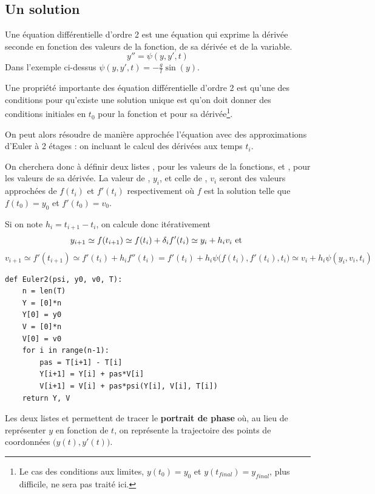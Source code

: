\subsection{Un solution} \label{sec:sol}
Une équation différentielle d'ordre 2 est une équation qui exprime la dérivée seconde en fonction des valeurs de la fonction, de sa dérivée et de la variable.
\[y'' = \psi(y, y', t)\]
Dans l'exemple ci-dessus $\psi(y, y', t) = -\frac g l \sin(y)$.

\medskip

Une propriété importante des équation différentielle d'ordre 2 est qu'une des conditions pour qu'existe une solution unique est qu'on doit donner des conditions initiales en $t_0$ pour la fonction et pour sa dérivée\footnote{Le cas des conditions aux limites, $y(t_0) = y_0$ et $y(t_{final}) = y_{final}$, plus difficile, ne sera pas traité ici.}.

On peut alors résoudre de manière approchée l'équation avec des approximations d'Euler à 2 étages : on incluant le calcul des dérivées aux temps $t_i$. 

On cherchera donc à définir deux listes , pour les valeurs de la fonctions, et , pour les valeurs de sa dérivée. La valeur de , $y_i$, et celle de , $v_i$ seront des valeurs approchées de $f(t_i)$ et $f'(t_i)$ respectivement où $f$ est la solution telle que $f(t_0) = y_0$ et $f'(t_0)= v_0$.

Si on note $h_i = t_{i+1} - t_i$, on calcule donc itérativement 
\[y_{i+1}\simeq f(t_{i+1}) \simeq f(t_i) + \delta_i f'(t_i)  \simeq y_i + h_i v_i\hbox{ et }\]
\[v_{i+1}\simeq f'(t_{i+1}) \simeq f'(t_i) + h_if''(t_i) = f'(t_i) + h_i\psi\bigl(f(t_i), f'(t_i),  t_i\bigr)\simeq v_i + h_i\psi(y_i, v_i, t_i)\]
\begin{lstlisting}
def Euler2(psi, y0, v0, T):
    n = len(T)           
    Y = [0]*n 
    Y[0] = y0 
    V = [0]*n 
    V[0] = v0 
    for i in range(n-1): 
        pas = T[i+1] - T[i]
        Y[i+1] = Y[i] + pas*V[i]
        V[i+1] = V[i] + pas*psi(Y[i], V[i], T[i])
    return Y, V
\end{lstlisting}
Les deux listes  et  permettent de tracer le {\bf portrait de phase} où, au lieu de représenter $y$ en fonction de $t$, on représente la trajectoire des points de coordonnées $\bigl(y(t), y'(t)\bigr)$.
